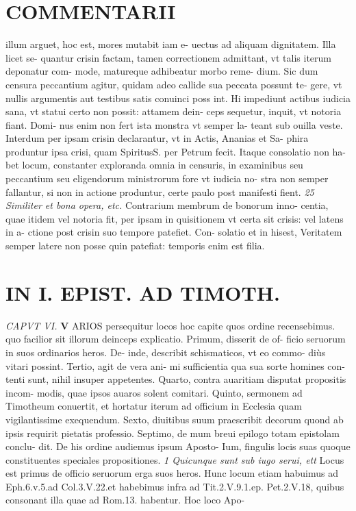 \documentclass{article}
\begin{document}
\begin{pages}
\section*{COMMENTARII }
\marginpar{[ p.142 ]}\pstart illum arguet, hoc est, mores mutabit iam e- uectus ad aliquam dignitatem. Illa licet se- quantur crisin factam, tamen correctionem admittant, vt talis iterum deponatur com- mode, matureque adhibeatur morbo reme- dium. Sic dum censura peccantium agitur, quidam adeo callide sua peccata possunt te- gere, vt nullis argumentis aut testibus satis conuinci poss int. Hi impediunt actibus iudicia sana, vt statui certo non possit: attamem dein- ceps sequetur, inquit, vt notoria fiant. Domi- nus enim non fert ista monstra vt semper la- teant sub ouilla veste. Interdum per ipsam crisin declarantur, vt in Actis, Ananias et Sa- phira produntur ipsa crisi, quam SpiritusS. per Petrum fecit. Itaque consolatio non ha- bet locum, constanter exploranda omnia in censuris, in examinibus seu peccantium seu eligendorum ministrorum fore vt iudicia no- stra non semper fallantur, si non in actione produntur, certe paulo post manifesti fient.  \pend
\textit{25 Similiter et bona opera, etc. }\pstart Contrarium membrum de bonorum inno- centia, quae itidem vel notoria fit, per ipsam in quisitionem vt certa sit crisis: vel latens in a- ctione post crisin suo tempore patefiet. Con- solatio et in hisest, Veritatem semper latere non posse quin patefiat: temporis enim est filia.  \pend
\section*{IN I. EPIST. AD TIMOTH. }
\marginpar{[ p.143 ]}
\textit{CAPVT VI. }
\textbf{V }\pstart ARIOS persequitur locos hoc capite quos ordine recensebimus. quo facilior sit illorum deinceps explicatio. Primum, disserit de of- ficio seruorum in suos ordinarios heros. De- inde, describit schismaticos, vt eo commo- diùs vitari possint. Tertio, agit de vera ani- mi sufficientia qua sua sorte homines con- tenti sunt, nihil insuper appetentes. Quarto, contra auaritiam disputat propositis incom- modis, quae ipsos auaros solent comitari. Quinto, sermonem ad Timotheum conuertit, et hortatur iterum ad officium in Ecclesia quam vigilantissime exequendum. Sexto, diuitibus suum praescribit decorum quond ab ipsis requirit pietatis professio. Septimo, de mum breui epilogo totam epistolam conclu- dit. De his ordine audiemus ipsum Aposto- Ium, fingulis locis suas quoque constituentes speciales propositiones.  \pend
\textit{1 Quicunque sunt sub iugo serui, ett }\pstart Locus est primus de officio seruorum erga suos heros. Hunc locum etiam habuimus ad Eph.6.v.5.ad Col.3.V.22.et habebimus infra ad Tit.2.V.9.1.ep. Pet.2.V.18, quibus consonant illa quae ad Rom.13. habentur. Hoc loco Apo-  \pend

\end{pages}
\end{document}
